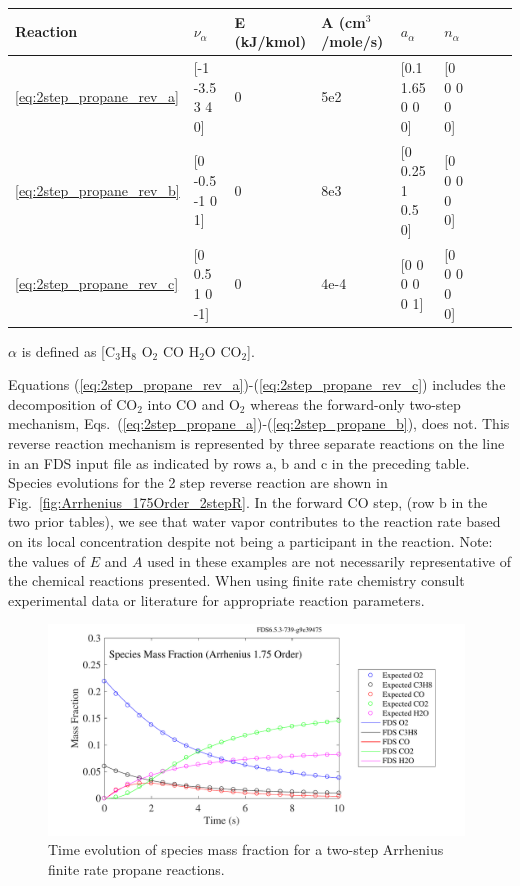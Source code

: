 \documentclass[11pt]{book}
\begin{document}
\begin{center}
\begin{tabular}{|l|l|l|l|l|l|l|l|l|}
\hline Reaction & $\nu_{\alpha}$ & E (kJ/kmol) & A (cm$^3$/mole/s) & $a_{\alpha}$ & $n_{\alpha}$  \\ \hline \hline
\ref{eq:2step_propane_rev_a} & [-1 -3.5 3 4 0] & 0 & 5e2  & [0.1 1.65 0 0 0] & [0 0 0 0 0] \\ \hline
\ref{eq:2step_propane_rev_b} & [0 -0.5 -1 0 1] & 0 & 8e3  & [0 0.25 1 0.5 0] & [0 0 0 0 0] \\ \hline
\ref{eq:2step_propane_rev_c} & [0 0.5 1 0 -1]  & 0 & 4e-4 & [0 0 0 0 0 1]    & [0 0 0 0 0] \\ \hline
\end{tabular}
\vskip8pt
$\alpha$ is defined as [$\mathrm{C_3H_8}$ $\mathrm{O_2}$ $\mathrm{CO}$ $\mathrm{H_2O}$ $\mathrm{CO_2}$].
\end{center}
Equations (\ref{eq:2step_propane_rev_a})-(\ref{eq:2step_propane_rev_c}) includes the decomposition of $\mathrm{CO_2}$ into $\mathrm{CO}$ and $\mathrm{O_2}$ whereas the forward-only two-step mechanism, Eqs.~(\ref{eq:2step_propane_a})-(\ref{eq:2step_propane_b}), does not. This reverse reaction mechanism is represented by three separate reactions on the  line in an FDS input file as indicated by rows $\mathrm{a}$, $\mathrm{b}$ and $\mathrm{c}$ in the preceding table. Species evolutions for the 2 step reverse reaction are shown in Fig.~\ref{fig:Arrhenius_175Order_2stepR}. In the forward CO step, (row $\mathrm{b}$ in the two prior tables), we see that water vapor contributes to the reaction rate based on its local concentration despite not being a participant in the reaction.
\vskip8pt
Note: the values of $E$ and $A$ used in these examples are not necessarily representative of the chemical reactions presented. When using finite rate chemistry consult experimental data or literature for appropriate reaction parameters.

\begin{figure}[h!]
\begin{center}
\includegraphics[height=2.2in]{SCRIPT_FIGURES/reactionrate_arrhenius_1p75order_2step}
\end{center}
\caption[Species evolution in a 1.75-order 2-step finite rate reaction]{Time evolution of species mass fraction for a two-step Arrhenius finite rate propane reactions.}
\label{fig:Arrhenius_175Order_2step}
\end{figure}
\end{document}
